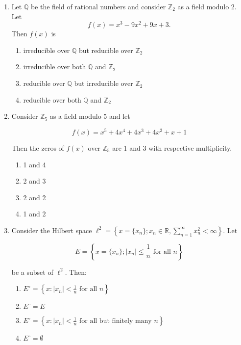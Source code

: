 \documentclass[journal]{IEEEtran}
\numberwithin{figure}{enumi}
\begin{document}
\begin{enumerate}
\item Let $\mathbb{Q}$ be the field of rational numbers and consider $\mathbb{Z}_2$ as a field modulo 2. Let 
\begin{equation}
f(x) = x^3 - 9x^2 + 9x + 3.
\end{equation}
Then $f(x)$ is
\begin{enumerate}
    \item irreducible over $\mathbb{Q}$ but reducible over $\mathbb{Z}_2$
    \item irreducible over both $\mathbb{Q}$ and $\mathbb{Z}_2$
    \item reducible over $\mathbb{Q}$ but irreducible over $\mathbb{Z}_2$
    \item reducible over both $\mathbb{Q}$ and $\mathbb{Z}_2$
\end{enumerate}
\item Consider $\mathbb{Z}_5$ as a field modulo 5 and let

\begin{equation}
f(x) = x^5 + 4x^4 + 4x^3 + 4x^2 + x + 1
\end{equation}

Then the zeros of $f(x)$ over $\mathbb{Z}_5$ are 1 and 3 with respective multiplicity.

\begin{enumerate}
    \item 1 and 4
    \item 2 and 3
    \item 2 and 2
    \item 1 and 2
\end{enumerate}

\item Consider the Hilbert space $\ell^2 = \left\{ x = \{x_n\}; x_n \in \mathbb{R}, \sum_{n=1}^{\infty} x_n^2 < \infty \right\}$. Let

\begin{equation}
E = \left\{ x = \{x_n\}; |x_n| \leq \frac{1}{n} \text{ for all } n \right\}
\end{equation}

be a subset of $\ell^2$. Then:

\begin{enumerate}
    \item $E^\circ = \left\{ x : |x_n| < \frac{1}{n} \text{ for all } n \right\}$
    \item $E^\circ = E$
    \item $E^\circ = \left\{ x : |x_n| < \frac{1}{n} \text{ for all but finitely many } n \right\}$
    \item $E^\circ = \emptyset$
\end{enumerate}


\end{enumerate}
\end{document}
